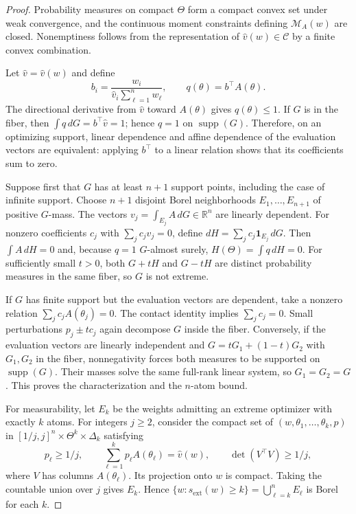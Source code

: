 \documentclass[11pt]{article}
\theoremstyle{definition}
\theoremstyle{remark}
\DeclareMathOperator{\supp}{supp}
\newcommand{\Mcal}{\mathcal M}
\newcommand{\Ccal}{\mathcal C}
\newcommand{\RR}{\mathbb R}
\newcommand{\vhat}{\widehat v}
\begin{document}
\begin{proof}
Probability measures on compact $\Theta$ form a compact convex set under weak
convergence, and the continuous moment constraints defining
$\Mcal_A(w)$ are closed.  Nonemptiness follows from the representation of
$\vhat(w)\in\Ccal$ by a finite convex combination.

Let $\widehat v=\vhat(w)$ and define
\[
 b_i=\frac{w_i}{\widehat v_i\sum_{\ell=1}^nw_\ell},
 \qquad q(\theta)=b^\top A(\theta).
\]
The directional derivative from $\widehat v$ toward $A(\theta)$ gives
$q(\theta)\le1$.  If $G$ is in the fiber, then
$\int q\,dG=b^\top\widehat v=1$; hence $q=1$ on $\supp(G)$.  Therefore, on
an optimizing support, linear dependence and affine dependence of the
evaluation vectors are equivalent: applying $b^\top$ to a linear relation
shows that its coefficients sum to zero.

Suppose first that $G$ has at least $n+1$ support points, including the case of
infinite support.  Choose $n+1$ disjoint Borel neighborhoods
$E_1,\ldots,E_{n+1}$ of positive $G$-mass.  The vectors
$v_j=\int_{E_j}A\,dG\in\RR^n$ are linearly dependent.  For nonzero
coefficients $c_j$ with $\sum_jc_jv_j=0$, define
$dH=\sum_jc_j\bm 1_{E_j}\,dG$.  Then $\int A\,dH=0$ and, because $q=1$
$G$-almost surely,
$H(\Theta)=\int q\,dH=0$.  For sufficiently small $t>0$, both $G+tH$ and
$G-tH$ are distinct probability measures in the same fiber, so $G$ is not
extreme.

If $G$ has finite support but the evaluation vectors are dependent, take a
nonzero relation $\sum_jc_jA(\theta_j)=0$.  The contact identity implies
$\sum_jc_j=0$.  Small perturbations $p_j\pm tc_j$ again decompose $G$ inside
the fiber.  Conversely, if the evaluation vectors are linearly independent
and $G=tG_1+(1-t)G_2$ with $G_1,G_2$ in the fiber, nonnegativity forces both
measures to be supported on $\supp(G)$.  Their masses solve the same full-rank
linear system, so $G_1=G_2=G$.  This proves the characterization and the
$n$-atom bound.

For measurability, let $E_k$ be the weights admitting an extreme optimizer
with exactly $k$ atoms.  For integers $j\ge2$, consider the compact set of
$(w,\theta_1,\ldots,\theta_k,p)$ in
$[1/j,j]^n\times\Theta^k\times\Delta_k$ satisfying
\[
 p_\ell\ge1/j,\qquad
 \sum_{\ell=1}^kp_\ell A(\theta_\ell)=\vhat(w),
 \qquad \det(V^\top V)\ge1/j,
\]
where $V$ has columns $A(\theta_\ell)$.  Its projection onto $w$ is compact.
Taking the countable union over $j$ gives $E_k$.  Hence
$\{w:s_{\mathrm{ext}}(w)\ge k\}=\bigcup_{\ell=k}^nE_\ell$ is Borel for
each $k$.
\end{proof}
\end{document}
